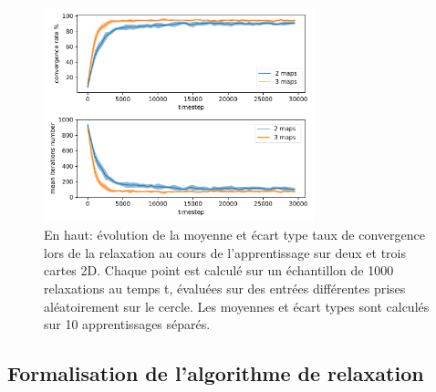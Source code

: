 \begin{figure}
\centering
\includegraphics[width=0.7\textwidth]{2D_conv_evolution_total.pdf}
\caption{En haut: évolution de la moyenne et écart type taux de convergence lors de la relaxation au cours de l'apprentissage sur deux et trois cartes 2D. Chaque point est calculé sur un échantillon de 1000 relaxations au temps t, évaluées sur des entrées différentes prises aléatoirement sur le cercle. Les moyennes et écart types sont calculés sur 10 apprentissages séparés.}
\label{fig:conv_evolution2D}
\end{figure}

\subsection{Formalisation de l'algorithme de relaxation}

